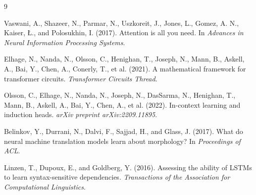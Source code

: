 \documentclass[11pt]{article}
\newcommand{\1}{\mathbf{1}}
\begin{document}

\begin{thebibliography}{9}

Vaswani, A., Shazeer, N., Parmar, N., Uszkoreit, J., Jones, L., Gomez, A. N.,
Kaiser, \L., and Polosukhin, I. (2017).
\newblock Attention is all you need.
\newblock In \emph{Advances in Neural Information Processing Systems}.

Elhage, N., Nanda, N., Olsson, C., Henighan, T., Joseph, N., Mann, B., Askell,
A., Bai, Y., Chen, A., Conerly, T., et al. (2021).
\newblock A mathematical framework for transformer circuits.
\newblock \emph{Transformer Circuits Thread}.

Olsson, C., Elhage, N., Nanda, N., Joseph, N., DasSarma, N., Henighan, T.,
Mann, B., Askell, A., Bai, Y., Chen, A., et al. (2022).
\newblock In-context learning and induction heads.
\newblock \emph{arXiv preprint arXiv:2209.11895}.

Belinkov, Y., Durrani, N., Dalvi, F., Sajjad, H., and Glass, J. (2017).
\newblock What do neural machine translation models learn about morphology?
\newblock In \emph{Proceedings of ACL}.

Linzen, T., Dupoux, E., and Goldberg, Y. (2016).
\newblock Assessing the ability of LSTMs to learn syntax-sensitive dependencies.
\newblock \emph{Transactions of the Association for Computational Linguistics}.

\end{thebibliography}
\end{document}
